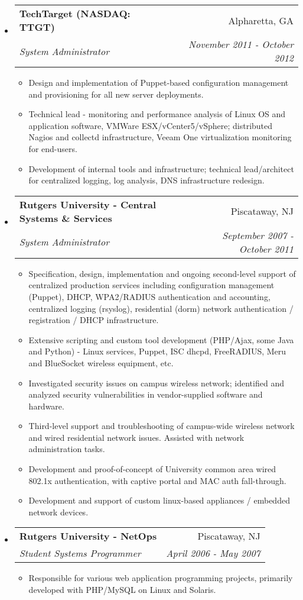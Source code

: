 \documentclass[letterpaper,11pt]{article}
\makeatletter
\newcommand{\resitem}[1]{\item #1 \vspace{-2pt}}
\newcommand{\ressubheading}[4]{
\begin{tabular*}{7.0in}{l@{\extracolsep{\fill}}r}
		\textbf{#1} & #2 \\
		\textit{#3} & \textit{#4} \\
\end{tabular*}\vspace{-6pt}}
\makeatother
\begin{document}
\begin{itemize}
\item
	\ressubheading{TechTarget  (NASDAQ: TTGT)}{Alpharetta, GA}{System Administrator}{November 2011 - October 2012}
	\begin{itemize}
		\resitem{Design and implementation of Puppet-based configuration management and provisioning for all new server deployments.}
                \resitem{Technical lead - monitoring and performance analysis of Linux OS and application software, VMWare ESX/vCenter5/vSphere; distributed Nagios and collectd infrastructure, Veeam One virtualization monitoring for end-users.}
                \resitem{Development of internal tools and infrastructure; technical lead/architect for centralized logging, log analysis, DNS infrastructure redesign.}
	\end{itemize}
\pagebreak
\item
	\ressubheading{Rutgers University - Central Systems \&
          Services}{Piscataway, NJ}{System Administrator}{September 2007 - October 2011}
	\begin{itemize}
                \resitem{Specification, design, implementation and ongoing second-level support of centralized production services including configuration management (Puppet), DHCP, WPA2/RADIUS authentication and accounting, centralized logging (rsyslog), residential (dorm) network authentication / registration / DHCP infrastructure.}
                \resitem{Extensive scripting and custom tool development
                  (PHP/Ajax, some Java and Python)
                  - Linux services, Puppet, ISC dhcpd, FreeRADIUS, Meru and BlueSocket wireless equipment, etc.}
                \resitem{Investigated security issues on campus wireless network; identified and analyzed security vulnerabilities in vendor-supplied software and hardware.}
                \resitem{Third-level support and troubleshooting of campus-wide wireless network and wired residential network issues. Assisted with network administration tasks.}
		\resitem{Development and proof-of-concept of University common area wired 802.1x authentication, with captive portal and MAC auth fall-through.}
		\resitem{Development and support of custom linux-based appliances / embedded network devices.}
	\end{itemize}

\item
	\ressubheading{Rutgers University - NetOps}{Piscataway, NJ}{Student Systems Programmer}{April 2006 - May 2007}
	\begin{itemize}
		\resitem{Responsible for various web application programming projects, primarily developed with
                  PHP/MySQL on Linux and Solaris.}
	\end{itemize}

\end{itemize}
\end{document}
